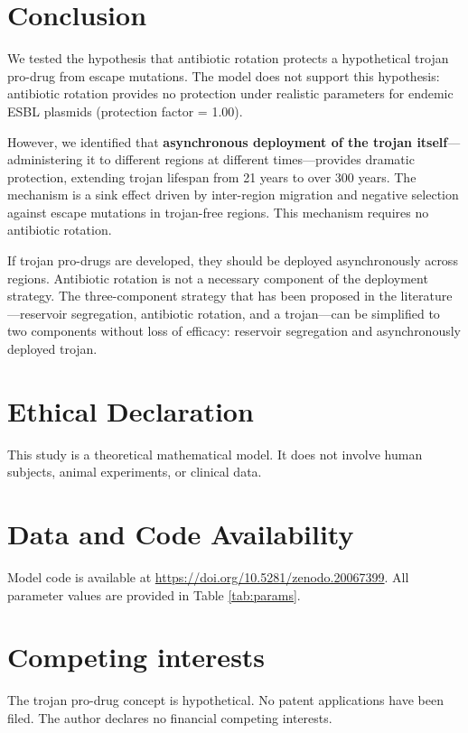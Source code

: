 \documentclass[12pt,a4paper]{article}
\begin{document}
\section{Conclusion}

We tested the hypothesis that antibiotic rotation protects a hypothetical trojan pro-drug from escape mutations. The model does not support this hypothesis: antibiotic rotation provides no protection under realistic parameters for endemic ESBL plasmids (protection factor = 1.00).

However, we identified that \textbf{asynchronous deployment of the trojan itself}---administering it to different regions at different times---provides dramatic protection, extending trojan lifespan from 21 years to over 300 years. The mechanism is a sink effect driven by inter-region migration and negative selection against escape mutations in trojan-free regions. This mechanism requires no antibiotic rotation.

If trojan pro-drugs are developed, they should be deployed asynchronously across regions. Antibiotic rotation is not a necessary component of the deployment strategy. The three-component strategy that has been proposed in the literature---reservoir segregation, antibiotic rotation, and a trojan---can be simplified to two components without loss of efficacy: reservoir segregation and asynchronously deployed trojan.

\section*{Ethical Declaration}

This study is a theoretical mathematical model. It does not involve human subjects, animal experiments, or clinical data.

\section*{Data and Code Availability}

Model code is available at \url{https://doi.org/10.5281/zenodo.20067399}. All parameter values are provided in Table \ref{tab:params}.

\section*{Competing interests}

The trojan pro-drug concept is hypothetical. No patent applications have been filed. The author declares no financial competing interests.
\end{document}
